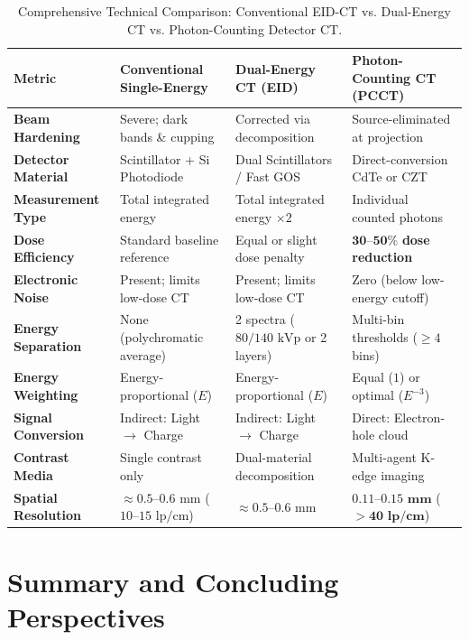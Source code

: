 \documentclass[11pt,a4paper]{article}
\begin{document}
\begin{table}[htbp]
\centering
\small
\setlength{\tabcolsep}{2.5pt}
\caption{Comprehensive Technical Comparison: Conventional EID-CT vs. Dual-Energy CT vs. Photon-Counting Detector CT.}
\label{tab:spectral_comparison}
\begin{tabular}{p{3.0cm} p{3.4cm} p{3.8cm} p{4.2cm}}
\toprule
\textbf{Metric} & \textbf{Conventional Single-Energy} & \textbf{Dual-Energy CT (EID)} & \textbf{Photon-Counting CT (PCCT)} \\
\midrule
\textbf{Beam Hardening} & Severe; dark bands \& cupping & Corrected via decomposition & Source-eliminated at projection \\
\addlinespace
\textbf{Detector Material} & Scintillator + Si Photodiode & Dual Scintillators / Fast GOS & Direct-conversion CdTe or CZT \\
\addlinespace
\textbf{Measurement Type} & Total integrated energy & Total integrated energy $\times 2$ & Individual counted photons \\
\addlinespace
\textbf{Dose Efficiency} & Standard baseline reference & Equal or slight dose penalty & $\mathbf{30\text{--}50\%}$ \textbf{dose reduction} \\
\addlinespace
\textbf{Electronic Noise} & Present; limits low-dose CT & Present; limits low-dose CT & Zero (below low-energy cutoff) \\
\addlinespace
\textbf{Energy Separation} & None (polychromatic average) & 2 spectra ($80/140\text{ kVp}$ or 2 layers) & Multi-bin thresholds ($\ge 4$ bins) \\
\addlinespace
\textbf{Energy Weighting} & Energy-proportional ($E$) & Energy-proportional ($E$) & Equal ($1$) or optimal ($E^{-3}$) \\
\addlinespace
\textbf{Signal Conversion} & Indirect: Light $\to$ Charge & Indirect: Light $\to$ Charge & Direct: Electron-hole cloud \\
\addlinespace
\textbf{Contrast Media} & Single contrast only & Dual-material decomposition & Multi-agent K-edge imaging \\
\addlinespace
\textbf{Spatial Resolution} & $\approx 0.5\text{--}0.6\text{ mm}$ ($10\text{--}15\text{ lp/cm}$) & $\approx 0.5\text{--}0.6\text{ mm}$ & $\mathbf{0.11\text{--}0.15\text{ mm}}$ ($\mathbf{> 40\text{ lp/cm}}$) \\
\bottomrule
\end{tabular}
\end{table}

\section{Summary and Concluding Perspectives}
\end{document}
